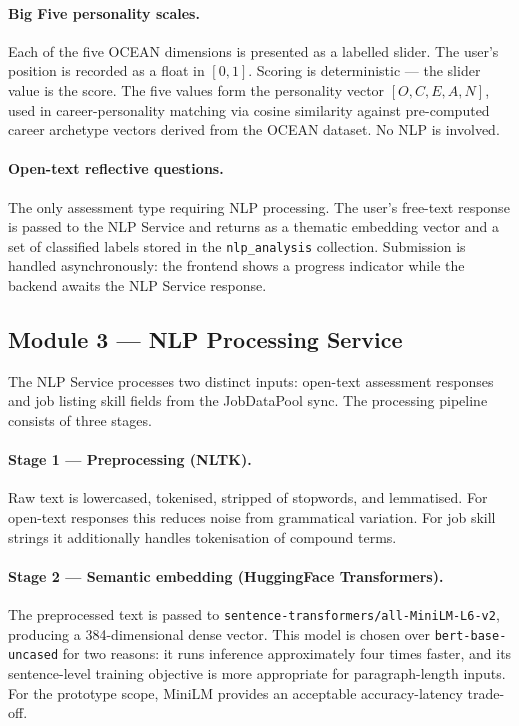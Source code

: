\paragraph{Big Five personality scales.}
Each of the five OCEAN dimensions is presented as a labelled slider. The user's
position is recorded as a float in $[0, 1]$. Scoring is deterministic --- the
slider value is the score. The five values form the personality vector
$[O, C, E, A, N]$, used in career-personality matching via cosine similarity
against pre-computed career archetype vectors derived from the OCEAN dataset.
No NLP is involved.

\paragraph{Open-text reflective questions.}
The only assessment type requiring NLP processing. The user's free-text
response is passed to the NLP Service and returns as a thematic embedding
vector and a set of classified labels stored in the \texttt{nlp\_analysis}
collection. Submission is handled asynchronously: the frontend shows a
progress indicator while the backend awaits the NLP Service response.

\subsection*{Module 3 --- NLP Processing Service}

The NLP Service processes two distinct inputs: open-text assessment responses
and job listing skill fields from the JobDataPool sync. The processing pipeline
consists of three stages.

\paragraph{Stage 1 --- Preprocessing (NLTK).}
Raw text is lowercased, tokenised, stripped of stopwords, and lemmatised.
For open-text responses this reduces noise from grammatical variation. For
job skill strings it additionally handles tokenisation of compound terms.

\paragraph{Stage 2 --- Semantic embedding (HuggingFace Transformers).}
The preprocessed text is passed to
\texttt{sentence-transformers/all-MiniLM-L6-v2}, producing a 384-dimensional
dense vector. This model is chosen over \texttt{bert-base-uncased} for two
reasons: it runs inference approximately four times faster, and its
sentence-level training objective is more appropriate for paragraph-length
inputs. For the prototype scope, MiniLM provides an acceptable
accuracy-latency trade-off.


